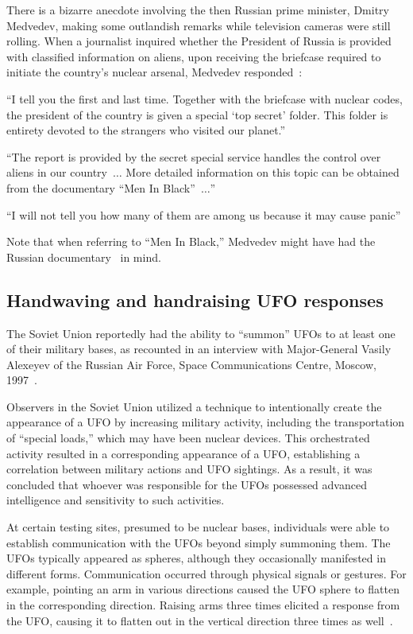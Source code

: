 There is a bizarre anecdote involving the then Russian prime minister, Dmitry Medvedev, making some outlandish remarks while television cameras were still rolling. When a journalist inquired whether the President of Russia is provided with classified information on aliens, upon receiving the briefcase required to initiate the country's nuclear arsenal, Medvedev responded~\cite{Sky2012Dec}:
\begin{svgraybox}
``I tell you the first and last time.
Together with the briefcase with nuclear codes, the president of the country is given a special `top secret' folder.
This folder is entirety devoted to the strangers who visited our planet.''

``The report is provided by the secret special service  handles the control over aliens in our country~$\ldots$
More detailed information on this topic can be obtained from the documentary ``Men In Black''~$\ldots$''

``I will not tell you how many of them are among us because it may cause panic''
\end{svgraybox}
Note that when referring to ``Men In Black,'' Medvedev might have had the Russian documentary~\cite{Ufodisclosure20162013Feb} in mind.

\subsection{Handwaving and handraising UFO responses}

The Soviet Union reportedly had the ability to ``summon'' UFOs to at least one of their military bases, as recounted in an interview with Major-General Vasily Alexeyev of the Russian Air Force, Space Communications Centre, Moscow, 1997~\cite{Hesemann2000,Uvarov_2000}.

Observers in the Soviet Union utilized a technique to intentionally create the appearance of a UFO by increasing military activity, including the transportation of ``special loads,'' which may have been nuclear devices. This orchestrated activity resulted in a corresponding appearance of a UFO, establishing a correlation between military actions and UFO sightings. As a result, it was concluded that whoever was responsible for the UFOs possessed advanced intelligence and sensitivity to such activities.

At certain testing sites, presumed to be nuclear bases, individuals were able to establish communication with the UFOs beyond simply summoning them. The UFOs typically appeared as spheres, although they occasionally manifested in different forms. Communication occurred through physical signals or gestures. For example, pointing an arm in various directions caused the UFO sphere to flatten in the corresponding direction. Raising arms three times elicited a response from the UFO, causing it to flatten out in the vertical direction three times as well~\cite{Hesemann2000,Uvarov_2000}.

